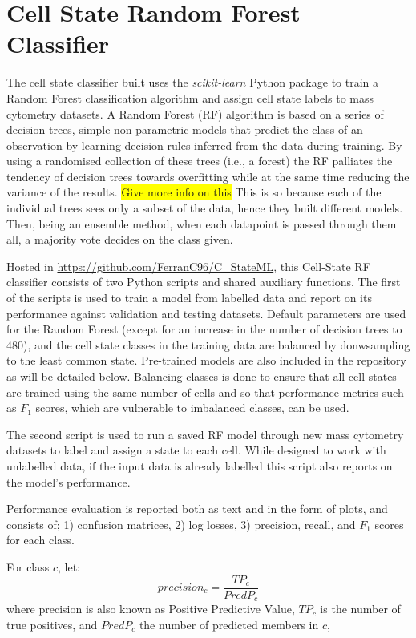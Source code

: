 \section{Cell State Random Forest Classifier}

The cell state classifier built uses the \emph{scikit-learn} Python package \cite{pedregosa_scikit-learn_2011} to train a Random Forest classification algorithm and assign cell state labels to mass cytometry datasets. A Random Forest (RF) algorithm is based on a series of decision trees, simple non-parametric models that predict the class of an observation by learning decision rules inferred from the data during training. By using a randomised collection of these trees (i.e., a forest) the RF palliates the tendency of decision trees towards overfitting while at the same time reducing the variance of the results. \colorbox{yellow}{Give more info on this} This is so because each of the individual trees sees only a subset of the data, hence they built different models. Then, being an ensemble method, when each datapoint is passed through them all, a majority vote decides on the class given.

Hosted in \url{https://github.com/FerranC96/C\_StateML}, this Cell-State RF classifier consists of two Python scripts and shared auxiliary functions. 
The first of the scripts is used to train a model from labelled data and report on its performance against validation and testing datasets. Default parameters are used for the Random Forest (except for an increase in the number of decision trees to 480), and the cell state classes in the training data are balanced by donwsampling to the least common state. Pre-trained models are also included in the repository as will be detailed below.
Balancing classes is done to ensure that all cell states are trained using the same number of cells and so that performance metrics such as $F_1$ scores, which are vulnerable to imbalanced classes, can be used.

The second script is used to run a saved RF model through new mass cytometry datasets to label and assign a state to each cell. While designed to work with unlabelled data, if the input data is already labelled this script also reports on the model's performance. 

Performance evaluation is reported both as text and in the form of plots, and consists of; 1) confusion matrices, 2) log losses, 3) precision, recall, and $F_1$ scores for each class. 

 For class $c$, let:
\[precision_c = \frac{TP_c}{PredP_c}\]
where precision is also known as Positive Predictive Value, $TP_c$ is the number of true positives, and $PredP_c$ the number of predicted members in $c$,

